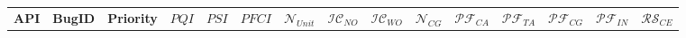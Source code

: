 \begin{table*}[t]
\setlength{\tabcolsep}{4.5pt}
\centering
\scriptsize
\begin{tabular}{l|l|l|l|l|c|c|c|c|c|c|c|c|c|l}
\multicolumn{1}{c|}{\textbf{API}} &
\multicolumn{1}{c|}{\textbf{BugID}} &
\multicolumn{1}{c|}{\textbf{Priority}} &
\multicolumn{1}{c|}{\textbf{$PQI$}} &
\multicolumn{1}{c|}{\textbf{$PSI$}} &
\multicolumn{1}{c|}{\textbf{$PFCI$}} &
\multicolumn{1}{c|}{\textbf{$\mathcal{N}_{Unit}$}} & 
\multicolumn{1}{c|}{\textbf{$\mathcal{IC}_{NO}$}} & %
\multicolumn{1}{c|}{\textbf{$\mathcal{IC}_{WO}$}} & %
\multicolumn{1}{c|}{\textbf{$\mathcal{N}_{CG}$}} &
\multicolumn{1}{c|}{\textbf{$\mathcal{PF}_{CA}$}} & %
\multicolumn{1}{c|}{\textbf{$\mathcal{PF}_{TA}$}} & %
\multicolumn{1}{c|}{\textbf{$\mathcal{PF}_{CG}$}} & %
\multicolumn{1}{c|}{\textbf{$\mathcal{PF}_{IN}$}} & %
\multicolumn{1}{c}{\textbf{$\mathcal{RS}_{CE}$}}\\ %


\end{tabular}
\end{table*}
